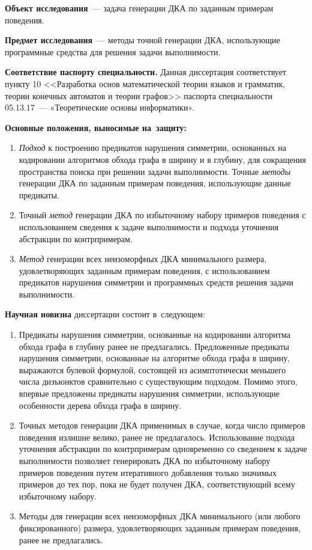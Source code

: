 \textbf{Объект исследования}~{---} задача генерации ДКА по заданным примерам поведения.

\textbf{Предмет исследования}~{---} методы точной генерации ДКА, использующие программные средства для решения задачи выполнимости.

\textbf{Соответствие паспорту специальности.} Данная диссертация соответствует пункту 10 <<Разработка основ математической теории языков и грамматик, теории конечных автоматов и теории графов>> паспорта специальности 05.13.17~--- «Теоретические основы информатики».

\textbf{Основные положения, выносимые на~защиту:}
\begin{enumerate}
  \item \emph{Подход} к построению предикатов нарушения симметрии, основанных на кодировании алгоритмов обхода графа в ширину и в глубину, для сокращения пространства поиска при решении задачи выполнимости.
  Точные \emph{методы} генерации ДКА по заданным примерам поведения, использующие данные предикаты.
  
  \item Точный \emph{метод} генерации ДКА по избыточному набору примеров поведения с использованием сведения к задаче выполнимости и подхода уточнения абстракции по контрпримерам.

  \item \emph{Метод} генерации всех неизоморфных ДКА минимального размера, удовлетворяющих заданным примерам поведения, с использованием предикатов нарушения симметрии и программных средств решения задачи выполнимости.
\end{enumerate}

\textbf{Научная новизна} диссертации состоит в~следующем:
\begin{enumerate}
  \item Предикаты нарушения симметрии, основанные на кодировании алгоритма обхода графа в глубину ранее не предлагались.
  Предложенные предикаты нарушения симметрии, основанные на алгоритме обхода графа в ширину, выражаются булевой формулой, состоящей из асимптотически меньшего числа дизъюнктов сравнительно с существующим подходом.
  Помимо этого, впервые предложены предикаты нарушения симметрии, использующие особенности дерева обхода графа в ширину.

  \item Точных методов генерации ДКА применимых в случае, когда число примеров поведения излишне велико, ранее не предлагалось.
  Использование подхода уточнения абстракции по контрпримерам одновременно со сведением к задаче выполнимости позволяет генерировать ДКА по избыточному набору примеров поведения путем итеративного добавления только значимых примеров до тех пор, пока не будет получен ДКА, соответствующий всему избыточному набору.

  \item Методы для генерации всех неизоморфных ДКА минимального (или любого фиксированного) размера, удовлетворяющих заданным примерам поведения, ранее не предлагались.
\end{enumerate}

